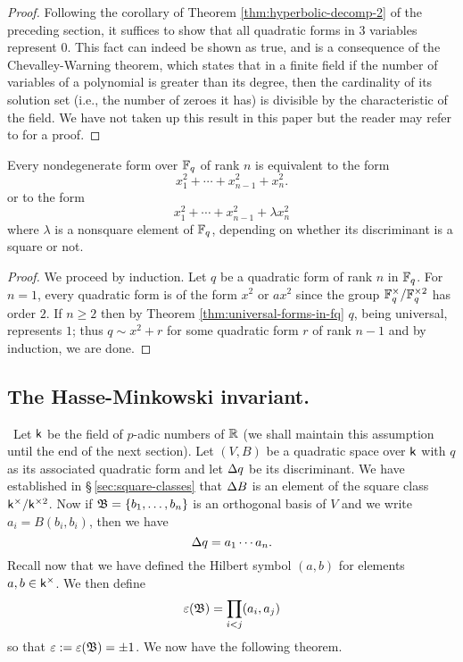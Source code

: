 \begin{proof}
    Following the corollary of Theorem \ref{thm:hyperbolic-decomp-2} of the preceding section, it suffices to show that all quadratic forms in \(3\) variables represent \(0\). This fact can indeed be shown as true, and is a consequence of the Chevalley-Warning theorem, which states that in a finite field if the number of variables of a polynomial is greater than its degree, then the cardinality of its solution set (i.e., the number of zeroes it has) is divisible by the characteristic of the field. We have not taken up this result in this paper but the reader may refer to \cite[p.~5]{serre2012course} for a proof.
\end{proof}

\begin{theoremx}\label{thm:quadratic-forms-fq-rank-n}
    Every nondegenerate form over \(\mathbb{F}_q\) of rank \(n\) is equivalent to the form
    \[
        x_1^2 + \cdots + x_{n-1}^2 + x_n^2.
    \]
    or to the form
    \[
        x_1^2 + \cdots + x_{n-1}^2 + \lambda x_n^2
    \]
    where \(\lambda\) is a nonsquare element of \(\mathbb{F}_q\), depending on whether its discriminant is a square or not.
\end{theoremx}

\begin{proof}
    We proceed by induction. Let \(q\) be a quadratic form of rank \(n\) in \(\mathbb{F}_q\). For \(n = 1\), every quadratic form is of the form \(x^2\) or \(ax^2\) since the group \(\mathbb{F}_q^{\times} / \mathbb{F}_q^{\times2}\) has order \(2\). If \(n \geq 2\) then by Theorem \ref{thm:universal-forms-in-fq} \(q\), being universal, represents \(1\); thus \(q \sim x^2 + r\) for some quadratic form \(r\) of rank \(n - 1\) and by induction, we are done.
\end{proof}

\subsection{The Hasse-Minkowski invariant.}~Let \(\mathsf{k}\) be the field of \(p\)-adic numbers of \(\mathbb{R}\) (we shall maintain this assumption until the end of the next section). Let \((V, B)\) be a quadratic space over \(\mathsf{k}\) with \(q\) as its associated quadratic form and let \({\Delta} q\) be its discriminant. We have established in \S\,\ref{sec:square-classes} that \({\Delta} B\) is an element of the square class \(\mathsf{k}^{\times}/\mathsf{k}^{\times2}\). Now if \(\mathfrak{B} = \{b_1, \dots, b_n\}\) is an orthogonal basis of \(V\) and we write \(a_{i} = B(b_i, b_i)\), then we have\label{sec:hasse-invariant}
\[
    {\Delta} q = a_1 \cdots a_n.  
\]
Recall now that we have defined the Hilbert symbol \((a, b)\) for elements \(a, b \in \mathsf{k}^{\times}\). We then define
\[
    \varepsilon(\mathfrak{B}) = \prod_{i < j} (a_i, a_j)
\]
so that \(\varepsilon := \varepsilon(\mathfrak{B}) = \pm 1\). We now have the following theorem.

